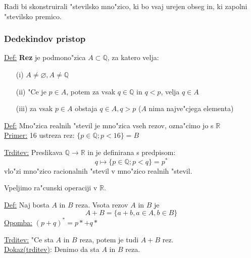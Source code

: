 Radi bi skonstruirali "stevilsko mno"zico, ki bo vsaj urejen obseg in, ki zapolni "stevilsko premico.

\subsubsection*{Dedekindov pristop}
\underline{Def:} \textbf{Rez} je podmono"zica \(A \subset \mathbb{Q}\), za katero velja:
\begin{enumerate}
	\item[(i)] \(A \neq \varnothing, A \neq \mathbb{Q}\)
	\item[(ii)] "Ce je \(p \in A\), potem za vsak \(q \in \mathbb{Q}\) in \(q < p\), velja \(q \in A\)
	\item[(iii)] za vsak \(p \in A\) obstaja \(q \in A, q > p\) (\(A\) nima najve"cjega elementa)
\end{enumerate}

\underline{Def:} Mno"zica realnih "stevil je mno"zica vseh rezov, ozna"cimo jo s \(\mathbb{R}\)\\
\underline{Primer:} 16 ustreza rez: \(\{p \in \mathbb{Q}; p < 16\} = B\)

\underline{Trditev:} Preslikava \(\mathbb{Q} \rightarrow \mathbb{R}\) in je definirana s predpisom:
\[q \mapsto \{p \in \mathbb{Q}; p < q\} = p^*\]
\hspace*{48pt}vlo"zi mno"zico racionalnih "stevil v mno"zico realnih "stevil.

Vpeljimo ra"cunski operaciji v \(\mathbb{R}\).

\underline{Def:} Naj bosta \(A\) in \(B\) reza. Vsota rezov \(A\) in \(B\) je
\[A + B = \{a + b, a \in A, b \in B\}\]
\hspace*{24pt}\underline{Opomba:} \((p + q)^* = p* + q*\)

\underline{Trditev:} "Ce sta \(A\) in \(B\) reza, potem je tudi \(A + B\) rez.\\
\underline{Dokaz(trditev)}: Denimo da sta \(A\) in \(B\) reza.

